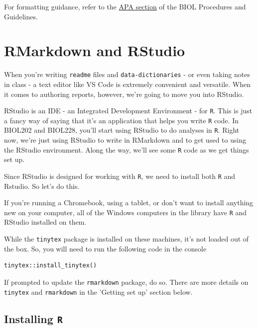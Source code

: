 \documentclass[
]{book}
\begin{document}
For formatting guidance, refer to the \href{https://ubco-biology.github.io/Procedures-and-Guidelines/apa-citations.html}{APA section} of the BIOL Procedures and Guidelines.

\hypertarget{rmarkdown-and-rstudio}{%
\section*{RMarkdown and RStudio}\label{rmarkdown-and-rstudio}}

When you're writing \texttt{readme} files and \texttt{data-dictionaries} - or even taking notes in class - a text editor like VS Code is extremely convenient and versatile. When it comes to authoring reports, however, we're going to move you into RStudio.

RStudio is an IDE - an Integrated Development Environment - for \texttt{R}. This is just a fancy way of saying that it's an application that helps you write \texttt{R} code. In BIOL202 and BIOL228, you'll start using RStudio to do analyses in \texttt{R}. Right now, we're just using RStudio to write in RMarkdown and to get used to using the RStudio environment. Along the way, we'll see some \texttt{R} code as we get things set up.

Since RStudio is designed for working with \texttt{R}, we need to install both \texttt{R} and Rstudio. So let's do this.

If you're running a Chromebook, using a tablet, or don't want to install anything new on your computer, all of the Windows computers in the library have \texttt{R} and RStudio installed on them.

While the \texttt{tinytex} package is installed on these machines, it's not loaded out of the box. So, you will need to run the following code in the console

\begin{verbatim}
tinytex::install_tinytex()
\end{verbatim}

If prompted to update the \texttt{rmarkdown} package, do so. There are more details on \texttt{tinytex} and \texttt{rmarkdown} in the 'Getting set up' section below.

\hypertarget{installing-r}{%
\subsection*{\texorpdfstring{Installing \texttt{R}}{Installing R}}\label{installing-r}}
\end{document}
